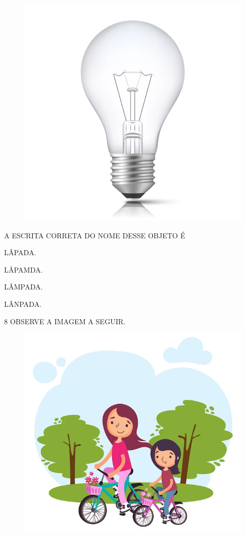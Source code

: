 \begin{figure}[H]
\centering
\includegraphics[width=.6\textwidth]{./media/image240.png}
\end{figure}

A ESCRITA CORRETA DO NOME DESSE OBJETO É

\begin{escolha}

\item LÂPADA.

\item LÂPAMDA.

\item LÂMPADA.

\item LÂNPADA.

\end{escolha}

\num{8} OBSERVE A IMAGEM A SEGUIR.

\begin{figure}[H]
\centering
\includegraphics[width=.6\textwidth]{./media/image241.png}
\end{figure}

